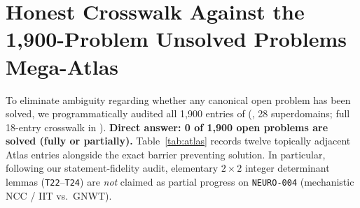 \documentclass[11pt,letterpaper]{amsart}
\begin{document}
\section{Honest Crosswalk Against the 1,900-Problem Unsolved Problems Mega-Atlas}

To eliminate ambiguity regarding whether any canonical open problem has been solved, we programmatically audited all 1,900 entries of  (, 28 superdomains; full 18-entry crosswalk in ). \textbf{Direct answer: 0 of 1,900 open problems are solved (fully or partially).} Table~\ref{tab:atlas} records twelve topically adjacent Atlas entries alongside the exact barrier preventing solution. In particular, following our statement-fidelity audit, elementary $2\times 2$ integer determinant lemmas (\texttt{T22}--\texttt{T24}) are \emph{not} claimed as partial progress on \texttt{NEURO-004} (mechanistic NCC / IIT vs.\ GNWT).
\end{document}
